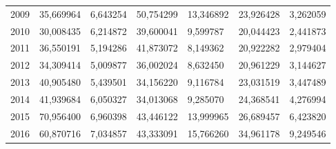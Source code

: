 \begin{table}
\begin{tabular}{p{1cm}p{2cm}p{2cm}p{2cm}p{2cm}p{2cm}p{2cm}}
 2009 &                 35,669964 &                                    6,643254 &    50,754299 &                         13,346892 &                      23,926428 &                       3,262059 \\
 2010 &                 30,008435 &                                    6,214872 &    39,600041 &                          9,599787 &                      20,044423 &                       2,441873 \\
 2011 &                 36,550191 &                                    5,194286 &    41,873072 &                          8,149362 &                      20,922282 &                       2,979404 \\
 2012 &                 34,309414 &                                    5,009877 &    36,002024 &                          8,632450 &                      20,961229 &                       3,144627 \\
 2013 &                 40,905480 &                                    5,439501 &    34,156220 &                          9,116784 &                      23,031519 &                       3,447489 \\
 2014 &                 41,939684 &                                    6,050327 &    34,013068 &                          9,285070 &                      24,368541 &                       4,276994 \\
 2015 &                 70,956400 &                                    6,960398 &    43,446122 &                         13,999965 &                      26,689457 &                       6,423820 \\
 2016 &                 60,870716 &                                    7,034857 &    43,333091 &                         15,766260 &                      34,961178 &                       9,249546 \\
\bottomrule
\end{tabular}
\end{table}
